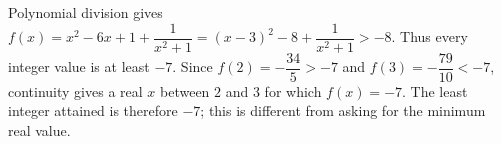 Polynomial division gives $f(x)=x^2-6x+1+\dfrac{1}{x^2+1}=(x-3)^2-8+\dfrac{1}{x^2+1}>-8$. Thus every integer value is at least $-7$. Since $f(2)=-\dfrac{34}{5}>-7$ and $f(3)=-\dfrac{79}{10}<-7$, continuity gives a real $x$ between $2$ and $3$ for which $f(x)=-7$. The least integer attained is therefore $\boxed{-7}$; this is different from asking for the minimum real value.
